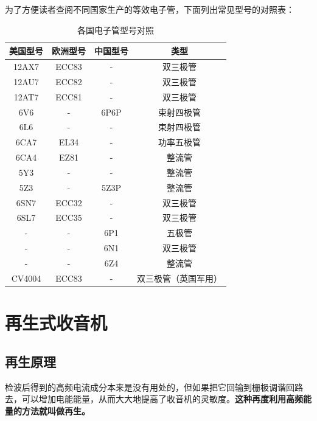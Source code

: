 \documentclass[12pt,UTF8]{ctexbook}
\begin{document}
为了方便读者查阅不同国家生产的等效电子管，下面列出常见型号的对照表：

\begin{table}[htbp]
    \centering
    \caption{各国电子管型号对照}
    \label{tab:tube_cross_reference}
    \begin{tabular}{|c|c|c|c|}
        \hline
        美国型号 & 欧洲型号 & 中国型号 & 类型 \\
        \hline
        12AX7 & ECC83 & - & 双三极管 \\
        \hline
        12AU7 & ECC82 & - & 双三极管 \\
        \hline
        12AT7 & ECC81 & - & 双三极管 \\
        \hline
        6V6 & - & 6P6P & 束射四极管 \\
        \hline
        6L6 & - & - & 束射四极管 \\
        \hline
        6CA7 & EL34 & - & 功率五极管 \\
        \hline
        6CA4 & EZ81 & - & 整流管 \\
        \hline
        5Y3 & - & - & 整流管 \\
        \hline
        5Z3 & - & 5Z3P & 整流管 \\
        \hline
        6SN7 & ECC32 & - & 双三极管 \\
        \hline
        6SL7 & ECC35 & - & 双三极管 \\
        \hline
        - & - & 6P1 & 五极管 \\
        \hline
        - & - & 6N1 & 双三极管 \\
        \hline
        - & - & 6Z4 & 整流管 \\
        \hline
        CV4004 & ECC83 & - & 双三极管（英国军用） \\
        \hline
    \end{tabular}
\end{table}

\chapter{再生式收音机}

\section{再生原理}

检波后得到的高频电流成分本来是没有用处的，但如果把它回输到栅极调谐回路去，可以增加电能能量，从而大大地提高了收音机的灵敏度。\textbf{这种再度利用高频能量的方法就叫做再生。}
\end{document}
